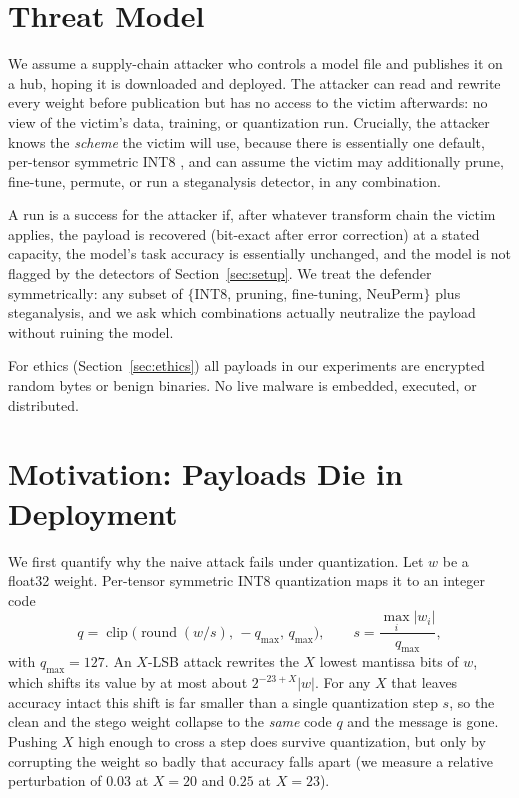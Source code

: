\documentclass[10pt,journal]{IEEEtran}
\theoremstyle{remark}
\begin{document}
\section{Threat Model}\label{sec:threat}
We assume a supply-chain attacker who controls a model file and publishes it on a hub,
hoping it is downloaded and deployed. The attacker can read and rewrite every weight
before publication but has no access to the victim afterwards: no view of the victim's
data, training, or quantization run. Crucially, the attacker knows the \emph{scheme}
the victim will use, because there is essentially one default, per-tensor symmetric
INT8 \cite{jacob2018quantization}, and can assume the victim may additionally
prune, fine-tune, permute, or run a steganalysis detector, in any combination.

A run is a success for the attacker if, after whatever transform chain the victim
applies, the payload is recovered (bit-exact after error correction) at a stated
capacity, the model's task accuracy is essentially unchanged, and the model is not
flagged by the detectors of Section~\ref{sec:setup}. We treat the defender
symmetrically: any subset of $\{$INT8, pruning, fine-tuning, NeuPerm$\}$ plus
steganalysis, and we ask which combinations actually neutralize the payload without
ruining the model.

For ethics (Section~\ref{sec:ethics}) all payloads in our experiments are encrypted
random bytes or benign binaries. No live malware is embedded, executed, or
distributed.

\section{Motivation: Payloads Die in Deployment}\label{sec:motiv}
We first quantify why the naive attack fails under quantization. Let
$w$ be a float32 weight. Per-tensor symmetric INT8 quantization maps it to an integer
code
\begin{equation}\label{eq:quant}
q=\operatorname{clip}\!\big(\operatorname{round}(w/s),\,-q_{\max},\,q_{\max}\big),
\qquad s=\frac{\max_i |w_i|}{q_{\max}},
\end{equation}
with $q_{\max}=127$. An $X$-LSB attack rewrites the $X$ lowest mantissa bits of $w$,
which shifts its value by at most about $2^{-23+X}|w|$. For any $X$ that leaves
accuracy intact this shift is far smaller than a single quantization step $s$, so the
clean and the stego weight collapse to the \emph{same} code $q$ and the message is
gone. Pushing $X$ high enough to cross a step does survive quantization, but only by
corrupting the weight so badly that accuracy falls apart (we measure a relative
perturbation of $0.03$ at $X{=}20$ and $0.25$ at $X{=}23$).
\end{document}
